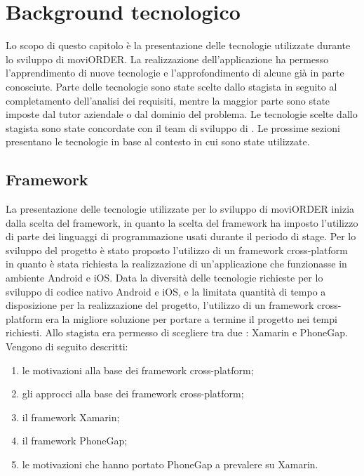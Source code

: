 
\chapter{Background tecnologico}

Lo scopo di questo capitolo è la presentazione delle tecnologie utilizzate durante lo sviluppo di moviORDER. La realizzazione dell'applicazione ha permesso l'apprendimento di nuove tecnologie e l'approfondimento di alcune già in parte conosciute. Parte delle tecnologie sono state scelte dallo stagista in seguito al completamento dell'analisi dei requisiti, mentre la maggior parte sono state imposte dal tutor aziendale o dal dominio del problema. Le tecnologie scelte dallo stagista sono state concordate con il team di sviluppo di \visione{}. Le prossime sezioni presentano le tecnologie in base al contesto in cui sono state utilizzate.

\section{Framework}	

La presentazione delle tecnologie utilizzate per lo sviluppo di moviORDER inizia dalla scelta del framework, in quanto la scelta del framework ha imposto l'utilizzo di parte dei linguaggi di programmazione usati durante il periodo di stage. Per lo sviluppo del progetto è stato proposto l'utilizzo di un framework cross-platform in quanto è stata richiesta la realizzazione di un'applicazione che funzionasse in ambiente Android e iOS. Data la diversità delle tecnologie richieste per lo sviluppo di codice nativo Android e iOS, e la limitata quantità di tempo a disposizione per la realizzazione del progetto, l'utilizzo di un framework cross-platform era la migliore soluzione per portare a termine il progetto nei tempi richiesti. Allo stagista era permesso di scegliere tra due : Xamarin e PhoneGap.\\ Vengono di seguito descritti:
\begin{enumerate}
	\item le motivazioni alla base dei framework cross-platform;
	\item gli approcci alla base dei framework cross-platform;
	\item il framework Xamarin;
	\item il framework PhoneGap;
	\item le motivazioni che hanno portato PhoneGap a prevalere su Xamarin.
\end{enumerate}

